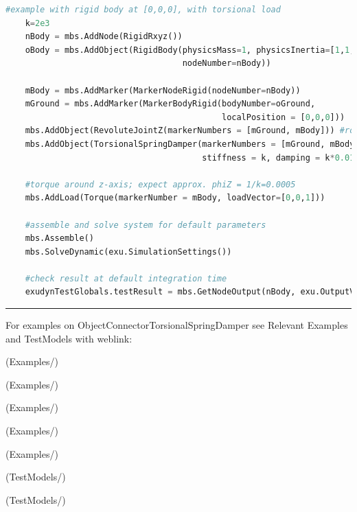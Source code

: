 \begin{lstlisting}[language=Python, firstnumber=1]
    #example with rigid body at [0,0,0], with torsional load
    k=2e3
    nBody = mbs.AddNode(RigidRxyz())
    oBody = mbs.AddObject(RigidBody(physicsMass=1, physicsInertia=[1,1,1,0,0,0], 
                                    nodeNumber=nBody))
    
    mBody = mbs.AddMarker(MarkerNodeRigid(nodeNumber=nBody))
    mGround = mbs.AddMarker(MarkerBodyRigid(bodyNumber=oGround, 
                                            localPosition = [0,0,0]))
    mbs.AddObject(RevoluteJointZ(markerNumbers = [mGround, mBody])) #rotation around ground Z-axis
    mbs.AddObject(TorsionalSpringDamper(markerNumbers = [mGround, mBody], 
                                        stiffness = k, damping = k*0.01, offset = 0))

    #torque around z-axis; expect approx. phiZ = 1/k=0.0005
    mbs.AddLoad(Torque(markerNumber = mBody, loadVector=[0,0,1])) 

    #assemble and solve system for default parameters
    mbs.Assemble()
    mbs.SolveDynamic(exu.SimulationSettings())
    
    #check result at default integration time
    exudynTestGlobals.testResult = mbs.GetNodeOutput(nBody, exu.OutputVariableType.Rotation)[2]
\end{lstlisting}

\vspace{6pt}\par\noindent\rule{\textwidth}{0.4pt}
%
\noindent For examples on ObjectConnectorTorsionalSpringDamper see Relevant Examples and TestModels with weblink:
\bi
\item {} (Examples/)
\item {} (Examples/)
\item {} (Examples/)
\item {} (Examples/)
\item {} (Examples/)
\item {} (TestModels/)
\item {} (TestModels/)

